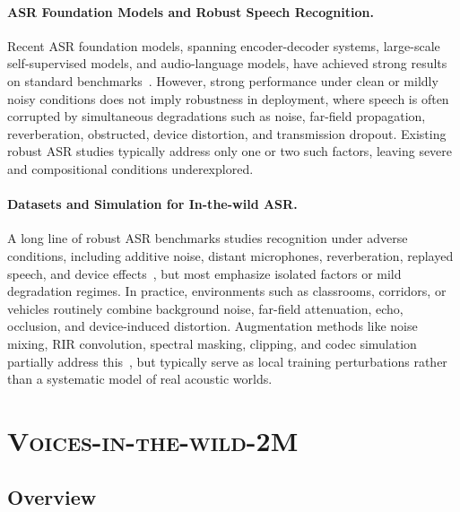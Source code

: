 \documentclass{article}
\begin{document}
\paragraph{ASR Foundation Models and Robust Speech Recognition.}
Recent ASR foundation models, spanning encoder-decoder systems, large-scale self-supervised models, and audio-language models, have achieved strong results on standard benchmarks~\citep{whisper, fireredasr2s, qwen3-asr, funasr, qwen2.5omni, qwen3-omni, Kimi-Audio, stepaudio2}. However, strong performance under clean or mildly noisy conditions does not imply robustness in deployment, where speech is often corrupted by simultaneous degradations such as noise, far-field propagation, reverberation, obstructed, device distortion, and transmission dropout. Existing robust ASR studies typically address only one or two such factors, leaving severe and compositional conditions underexplored.
\vspace{-4mm}
\paragraph{Datasets and Simulation for In-the-wild ASR.}
A long line of robust ASR benchmarks studies recognition under adverse conditions, including additive noise, distant microphones, reverberation, replayed speech, and device effects~\citep{Noizeus, CHIME4, VOICES, DAPS, ted-lium, commonvoice, voxpopuli}, but most emphasize isolated factors or mild degradation regimes. In practice, environments such as classrooms, corridors, or vehicles routinely combine background noise, far-field attenuation, echo, occlusion, and device-induced distortion. Augmentation methods like noise mixing, RIR convolution, spectral masking, clipping, and codec simulation partially address this~\citep{MUSAN, DNS, ko2015audio, ko2017audio, parada2022pmctpatchedmulticonditiontraining}, but typically serve as local training perturbations rather than a systematic model of real acoustic worlds.



\vspace{-2mm}
\section{ \textsc{Voices-in-the-wild-2M} }
\vspace{-3mm}
\subsection{Overview}
\vspace{-2mm}
\end{document}
